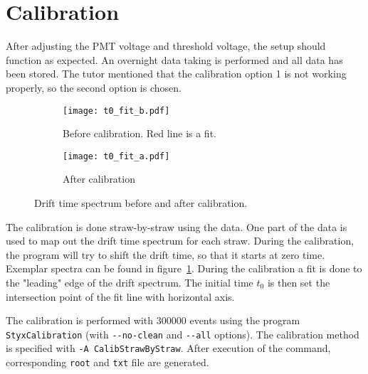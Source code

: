 \clearpage
\section{Calibration}\label{sec:cal}
After adjusting the PMT voltage and threshold voltage, the setup should function as expected. An overnight data taking is performed and all data has been stored. The tutor mentioned that the calibration option 1 is not working properly, so the second option is chosen. 

\begin{figure}[ht]
	\centering
	\begin{subfigure}[t]{0.6\textwidth}
	\begin{center}
	\texttt{[image: t0\_fit\_b.pdf]}
	\end{center}
	\caption{Before calibration. Red line is a fit.}
	\end{subfigure}
	\begin{subfigure}[t]{0.6\textwidth}
	\begin{center}
	\texttt{[image: t0\_fit\_a.pdf]}
	\end{center}
	\caption{After calibration}
	\end{subfigure}
	\caption{Drift time spectrum before and after calibration.}%
	\label{fig:drift-time}
\end{figure}
The calibration is done straw-by-straw using the data. One part of the data is used to map out the drift time spectrum for each straw. During the calibration, the program will try to shift the drift time, so that it starts at zero time. Exemplar spectra can be found in figure~\ref{fig:drift-time}. During the calibration a fit is done to the "leading" edge of the drift spectrum. The initial time $t_0$ is then set the intersection point of the fit line with horizontal axis.

The calibration is performed with \num{300 000} events using the program \verb|StyxCalibration| (with \verb|--no-clean| and \verb|--all| options). The calibration method is specified with \verb|-A CalibStrawByStraw|. After execution of the command, corresponding \verb|root| and \verb|txt| file are generated.

